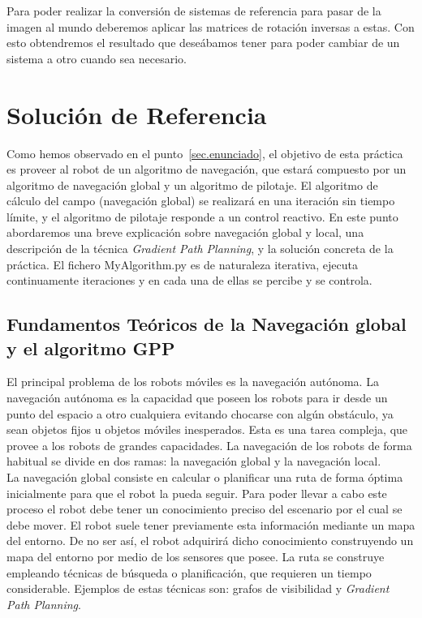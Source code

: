 Para poder realizar la conversión de sistemas de referencia para pasar de la imagen al mundo deberemos aplicar las matrices de rotación inversas a estas. Con esto obtendremos el resultado que deseábamos tener para poder cambiar de un sistema a otro cuando sea necesario.

\section{Solución de Referencia}\label{sec.solucion}
Como hemos observado en el punto~\ref{sec.enunciado}, el objetivo de esta práctica es proveer al robot de un algoritmo de navegación, que estará compuesto por un algoritmo de navegación global y un algoritmo de pilotaje. El algoritmo de cálculo del campo (navegación global) se realizará en una iteración sin tiempo límite, y el algoritmo de pilotaje responde a un control reactivo. En este punto abordaremos una breve explicación sobre navegación global y local, una descripción de la técnica \textit{Gradient Path Planning}, y la solución concreta de la práctica. El fichero MyAlgorithm.py es de naturaleza iterativa, ejecuta continuamente iteraciones y en cada una de ellas se percibe y se controla.

\subsection{Fundamentos Teóricos de la Navegación global y el algoritmo GPP}
El principal problema de los robots móviles es la navegación autónoma. La navegación autónoma es la capacidad que poseen los robots para ir desde un punto del espacio a otro cualquiera evitando chocarse con algún obstáculo, ya sean objetos fijos u objetos móviles inesperados. Esta es una tarea compleja, que provee a los robots de grandes capacidades. La navegación de los robots de forma habitual se divide en dos ramas: la navegación global y la navegación local.\\

La navegación global consiste en calcular o planificar una ruta de forma óptima inicialmente para que el robot la pueda seguir. Para poder llevar a cabo este proceso el robot debe tener un conocimiento preciso del escenario por el cual se debe mover. El robot suele tener previamente esta información mediante un mapa del entorno. De no ser así, el robot adquirirá dicho conocimiento construyendo un mapa del entorno por medio de los sensores que posee. La ruta se construye empleando técnicas de búsqueda o planificación, que requieren un tiempo considerable. Ejemplos de estas técnicas son: grafos de visibilidad y \textit{Gradient Path Planning}.\\

